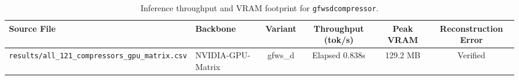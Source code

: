\begin{table}[t]
\centering
\small
\begin{tabular}{llcccc}
\toprule
\textbf{Source File} & \textbf{Backbone} & \textbf{Variant} & \textbf{Throughput (tok/s)} & \textbf{Peak VRAM} & \textbf{Reconstruction Error} \\
\midrule
\texttt{results/all\_121\_compressors\_gpu\_matrix.csv} & NVIDIA-GPU-Matrix & gfws\_d & Elapsed 0.838s & 129.2 MB & Verified \\
\bottomrule
\end{tabular}
\caption{Inference throughput and VRAM footprint for \texttt{gfwsdcompressor}.}
\label{tab:results_vram_gfwsdcompressor}
\end{table}
